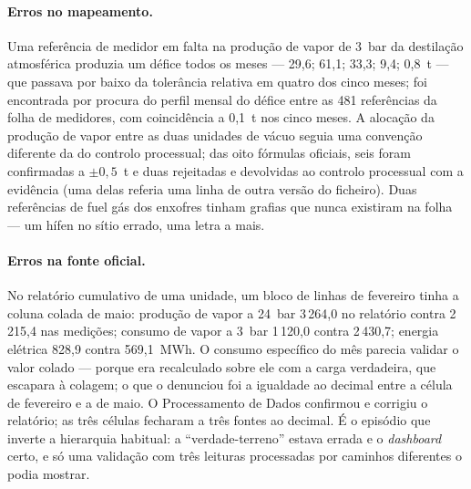 \paragraph{Erros no mapeamento.} Uma referência de medidor em falta na
produção de vapor de 3~bar da destilação atmosférica produzia um défice
todos os meses --- 29,6; 61,1; 33,3; 9,4; 0,8~t --- que passava por baixo
da tolerância relativa em quatro dos cinco meses; foi encontrada por
procura do perfil mensal do défice entre as 481 referências da folha de
medidores, com coincidência a 0,1~t nos cinco meses. A alocação da
produção de vapor entre as duas unidades de vácuo seguia uma convenção
diferente da do controlo processual; das oito fórmulas oficiais, seis
foram confirmadas a $\pm0{,}5$~t e duas rejeitadas e devolvidas ao
controlo processual com a evidência (uma delas referia uma linha de
outra versão do ficheiro). Duas referências de fuel gás dos enxofres
tinham grafias que nunca existiram na folha --- um hífen no sítio errado,
uma letra a mais.

\paragraph{Erros na fonte oficial.} No relatório cumulativo de uma
unidade, um bloco de linhas de fevereiro tinha a coluna colada de maio:
produção de vapor a 24~bar 3\,264,0 no relatório contra 2\,215,4 nas
medições; consumo de vapor a 3~bar 1\,120,0 contra 2\,430,7; energia
elétrica 828,9 contra 569,1~MWh. O consumo específico do mês parecia
validar o valor colado --- porque era recalculado sobre ele com a carga
verdadeira, que escapara à colagem; o que o denunciou foi a igualdade ao
decimal entre a célula de fevereiro e a de maio. O Processamento de Dados
confirmou e corrigiu o relatório; as três células fecharam a três fontes
ao decimal. É o episódio que inverte a hierarquia habitual: a
``verdade-terreno'' estava errada e o \emph{dashboard} certo, e só uma
validação com três leituras processadas por caminhos diferentes o podia
mostrar.

